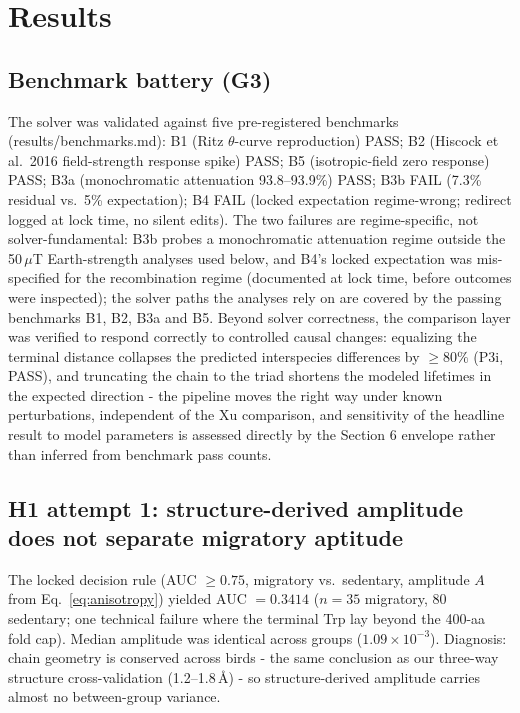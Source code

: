 \documentclass[12pt,a4paper]{article}
\begin{document}

\section{Results}
\subsection{Benchmark battery (G3)}
The solver was validated against five pre-registered benchmarks (results/benchmarks.md): B1 (Ritz $\theta$-curve reproduction) PASS; B2 (Hiscock et al.\ 2016 field-strength response spike) PASS; B5 (isotropic-field zero response) PASS; B3a (monochromatic attenuation 93.8--93.9\%) PASS; B3b FAIL (7.3\% residual vs.\ 5\% expectation); B4 FAIL (locked expectation regime-wrong; redirect logged at lock time, no silent edits). The two failures are regime-specific, not solver-fundamental: B3b probes a monochromatic attenuation regime outside the 50\,$\mu$T Earth-strength analyses used below, and B4's locked expectation was mis-specified for the recombination regime (documented at lock time, before outcomes were inspected); the solver paths the analyses rely on are covered by the passing benchmarks B1, B2, B3a and B5. Beyond solver correctness, the comparison layer was verified to respond correctly to controlled causal changes: equalizing the terminal distance collapses the predicted interspecies differences by $\ge 80\%$ (P3i, PASS), and truncating the chain to the triad shortens the modeled lifetimes in the expected direction - the pipeline moves the right way under known perturbations, independent of the Xu comparison, and sensitivity of the headline result to model parameters is assessed directly by the Section 6 envelope rather than inferred from benchmark pass counts.

\subsection{H1 attempt 1: structure-derived amplitude does not separate migratory aptitude}
The locked decision rule (AUC $\geq 0.75$, migratory vs.\ sedentary, amplitude $A$ from Eq.~\eqref{eq:anisotropy}) yielded AUC $= 0.3414$ ($n = 35$ migratory, $80$ sedentary; one technical failure where the terminal Trp lay beyond the 400-aa fold cap). Median amplitude was identical across groups ($1.09\times10^{-3}$). Diagnosis: chain geometry is conserved across birds - the same conclusion as our three-way structure cross-validation (1.2--1.8\,\AA) - so structure-derived amplitude carries almost no between-group variance.
\end{document}

